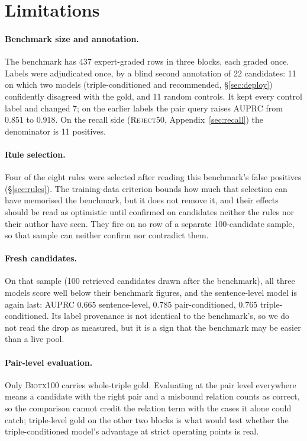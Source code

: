 \documentclass[11pt]{article}
\begin{document}
\section*{Limitations}

\paragraph{Benchmark size and annotation.}
The benchmark has 437 expert-graded rows in three blocks, each graded once. Labels were adjudicated
once, by a blind second annotation of 22 candidates: 11 on which two models (triple-conditioned and
recommended, \S\ref{sec:deploy}) confidently disagreed with the gold, and 11 random controls. It
kept every control label and changed 7; on the earlier labels the pair query raises AUPRC from
$0.851$ to $0.918$. On the recall side (\textsc{Reject50}, Appendix~\ref{sec:recall}) the
denominator is 11 positives.

\paragraph{Rule selection.}
Four of the eight rules were selected after reading this benchmark's false positives
(\S\ref{sec:rules}). The training-data criterion bounds how much that selection can have memorised
the benchmark, but it does not remove it, and their effects should be read as optimistic until
confirmed on candidates neither the rules nor their author have seen. They fire on no row of a
separate 100-candidate sample, so that sample can neither confirm nor contradict them.

\paragraph{Fresh candidates.}
On that sample (100 retrieved candidates drawn after the benchmark), all three models score well below their benchmark figures, and the
sentence-level model is again last: AUPRC $0.665$ sentence-level, $0.785$ pair-conditioned, $0.765$
triple-conditioned. Its label provenance is not identical to the benchmark's, so we do not read the
drop as measured, but it is a sign that the benchmark may be easier than a live pool.

\paragraph{Pair-level evaluation.}
Only \textsc{Biotx100} carries whole-triple gold. Evaluating at the pair level everywhere means a
candidate with the right pair and a misbound relation counts as correct, so the comparison cannot
credit the relation term with the cases it alone could catch; triple-level gold on the other two
blocks is what would test whether the triple-conditioned model's advantage at strict operating
points is real.
\end{document}
